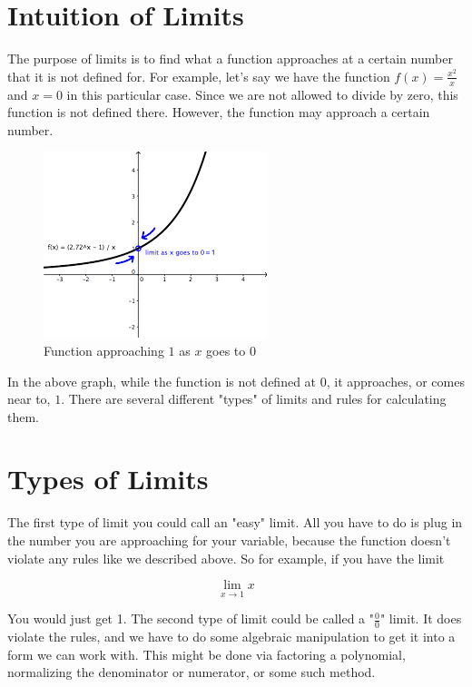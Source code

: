 \chapter{Intuition of Limits}
The purpose of limits is to find what a function approaches at a certain number that it is not defined for. 
For example, let's say we have the function $f(x) = \frac{x^2}{x}$ and $x = 0$ in this particular case. 
Since we are not allowed to divide by zero, this function is not defined there. 
However, the function may approach a certain number.

\begin{figure}[H]
\caption{Function approaching $1$ as $x$ goes to $0$}
\includegraphics[scale=0.8]{../limit.png}
\end{figure}

In the above graph, while the function is not defined at $0$, it approaches, or comes near to, $1$. 
There are several different "types" of limits and rules for calculating them. 
\chapter{Types of Limits}

The first type of limit you could call an "easy" limit. 
All you have to do is plug in the number you are approaching for your variable, because the function doesn't violate any rules like we described above. 
So for example, if you have the limit

\begin{equation*}
    \lim\limits_{x\rightarrow 1} x
\end{equation*}

You would just get 1. 
The second type of limit could be called a "$\frac{0}{0}$" limit. 
It does violate the rules, and we have to do some algebraic manipulation to get it into a form we can work with. 
This might be done via factoring a polynomial, normalizing the denominator or numerator, or some such method.

